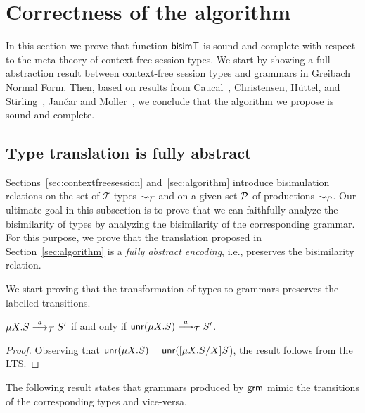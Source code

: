 \section{Correctness of the algorithm}
\label{sec:correctness}

In this section we prove that function $\BisimT$ is sound and complete
with respect to the meta-theory of context-free session types.
%
We start by showing a full abstraction result between context-free
session types and grammars in Greibach Normal Form.
%
Then, based on results from Caucal~\cite{caucal1986decidabilite},
Christensen, H{\"{u}}ttel, and
Stirling~\cite{DBLP:journals/iandc/ChristensenHS95}, Jan{\v{c}}ar and
Moller~\cite{janvcar1999techniques}, we conclude that the algorithm 
we propose is sound and complete.

\subsection{Type translation is fully abstract}

Sections~\ref{sec:contextfreesession} and~\ref{sec:algorithm}
introduce bisimulation relations on the set of $\mathcal T$ types
$\TypeEquiv$ and on a given set $\productions$ of productions
$\ProdEquiv$.  Our ultimate goal in this subsection is to prove that
we can faithfully analyze the bisimilarity of types by analyzing the
bisimilarity of the corresponding grammar. For this purpose, we prove
that the translation proposed in Section~\ref{sec:algorithm} is a
\emph{fully abstract encoding}, i.e., preserves the bisimilarity
relation. %

We start proving that the transformation of types to grammars preserves
the labelled transitions.

\begin{lemma}
  \label{lemma:unravelling}
  $\mu X. S \LTSderives[a] S'$ if and only if
  $\Unravel (\mu X. S) \LTSderives[a] S'$.
\end{lemma}
%
\begin{proof}
  Observing that
  $\Unravel(\mu X. S) = \Unravel(\subs{\mu X.S}{X}{S}$), the result
  follows from the LTS.
\end{proof}

The following result states that grammars produced by
$\grm$ mimic the transitions of the corresponding types
and vice-versa.

